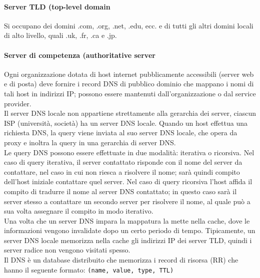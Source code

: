 \documentclass{report}
\begin{document}
	\paragraph{Server TLD (top-level domain} Si occupano dei domini .com, .org, .net, .edu, ecc. e di tutti gli altri domini locali di alto livello, quali .uk, .fr, .ca e .jp.
	\paragraph{Server di competenza (authoritative server} Ogni organizzazione dotata di host internet pubblicamente accessibili (server web e di posta) deve fornire i record DNS di pubblico dominio che mappano i nomi di tali host in indirizzi IP; possono essere mantenuti dall'organizzazione o dal service provider.
	\medskip\\Il server DNS locale non appartiene strettamente alla gerarchia dei server, ciascun ISP (università, società) ha un server DNS locale. Quando un host effettua una richiesta DNS, la query viene inviata al suo server DNS locale, che opera da proxy e inoltra la query in una gerarchia di server DNS.
	\medskip\\Le query DNS possono essere effettuate in due modalità: iterativa o ricorsiva. Nel caso di query iterativa, il server contattato risponde con il nome del server da contattare, nel caso in cui non riesca a risolvere il nome; sarà quindi compito dell'host iniziale contattare quel server. Nel caso di query ricorsiva l'host affida il compito di tradurre il nome al server DNS contattato; in questo caso sarà il server stesso a contattare un secondo server per risolvere il nome, al quale può a sua volta assegnare il compito in modo iterativo.
	\medskip\\Una volta che un server DNS impara la mappatura la mette nella cache, dove le informazioni vengono invalidate dopo un certo periodo di tempo. Tipicamente, un server DNS locale memorizza nella cache gli indirizzi IP dei server TLD, quindi i server radice non vengono visitati spesso.
	\medskip\\Il DNS è un database distribuito che memorizza i record di risorsa (RR) che hanno il seguente formato: \verb|(name, value, type, TTL)|
\end{document}
